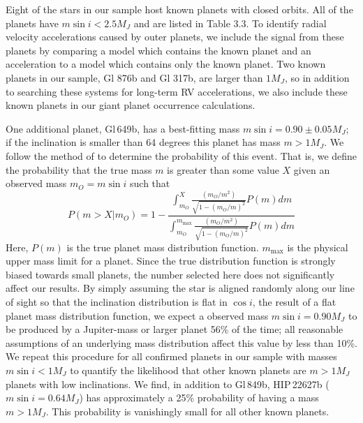 Eight of the stars in our sample host known planets with closed orbits. All of the planets have $m \sin i < 2.5 M_J$ and are listed in Table 3.3. To identify radial velocity accelerations caused by outer planets, we include the signal from these planets by comparing a model which contains the known planet and an acceleration to a model which contains only the known planet. Two known planets in our sample, Gl 876b and Gl 317b, are larger than $1 M_J$, so in addition to searching these systems for long-term RV accelerations, we also include these known planets in our giant planet occurrence calculations.
 

One additional planet, Gl\,649b, has a best-fitting mass $m \sin i = 0.90 \pm 0.05 M_J$; if the inclination is smaller than 64 degrees this planet has mass $ m > 1 M_J$. We follow the method of \citet{Ho11} to determine the probability of this event. That is, we define the probability that the true mass $m$ is greater than some value $X$ given an observed mass $m_O = m \sin i$ such that
\begin{equation}
P(m > X | m_O) = 1 - \frac{\int_{m_O}^X \frac{(m_O/m^2)}
{\sqrt{1-(m_O/m)^2}}P(m)dm}{\int_{m_O}^{m_\textrm{max}}
\frac{(m_O/m^2)}{\sqrt{1-(m_O/m)^2}}P(m)dm}
\end{equation}
Here, $P(m)$ is the true planet mass distribution function.
$m_\textrm{max}$ is the physical upper mass limit for a planet. Since the true distribution function is strongly biased towards small planets, the number selected here does not significantly affect our results. By simply assuming the star is aligned randomly along our line of sight so that the inclination distribution is flat in $\cos i$, the result of a flat planet mass distribution function, we expect a observed mass $m \sin i = 0.90 M_J$ to be produced by a Jupiter-mass or larger planet 56\% of the time; all reasonable assumptions of an underlying mass distribution affect this value by less than 10\%. We repeat this procedure for all confirmed planets in our sample with masses $m \sin i < 1 M_J$ to quantify the likelihood that other known planets are $m > 1 M_J$ planets with low inclinations. We find, in addition to Gl\,849b, HIP\,22627b ($m \sin i = 0.64 M_J$) has approximately a 25\% probability of having a mass $m > 1 M_J$. This probability is vanishingly small for all other known planets.

